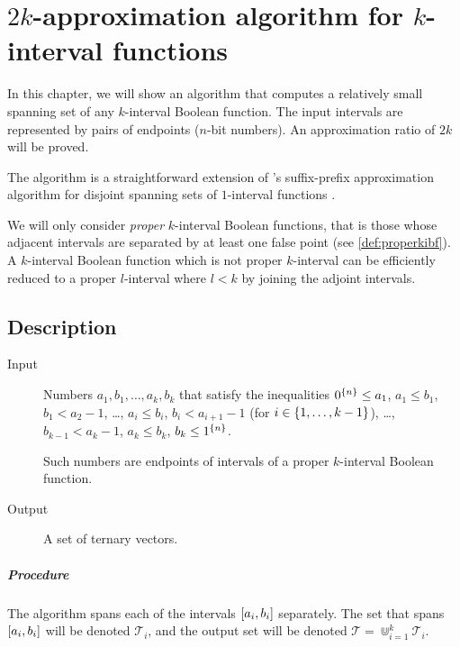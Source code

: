 \chapter{\texorpdfstring{$2k$}{2k}-approximation algorithm
for \texorpdfstring{$k$}{k}-interval functions}
\label{chap:2kapprox}

In this chapter,
we will show an algorithm that computes
a relatively
small spanning set
of any $k$-interval Boolean function.
The input intervals are represented by pairs of endpoints
($n$-bit numbers).
An approximation ratio of $2k$ will be proved.

The algorithm is a straightforward
extension of
\citeauthor{Schieber2005154}'s suffix-prefix
approximation algorithm
for disjoint spanning sets of $1$-interval functions
\citep[section 6]{Schieber2005154}.

We will only consider
\emph{proper} $k$-interval Boolean functions,
that is those whose adjacent intervals are separated by
at least one false point
(see \cref{def:properkibf}).
A $k$-interval Boolean function
which is not proper $k$-interval
can be efficiently reduced to a proper $l$-interval
where $l < k$
by joining the adjoint
intervals.

\section{Description}

\begin{description}
\item[Input] Numbers $a_1, b_1, \ldots, a_k, b_k$
that satisfy the inequalities
$0^{\{n\}} \leq a_1$,
$a_1 \leq b_1$,
$b_1 < a_2 - 1$,
\ldots,
$a_i \leq b_i$,
$b_i < a_{i+1} - 1$
(for $i \in \{1, \ldots, k-1\}$),
\ldots,
$b_{k-1} < a_k - 1$,
$a_k \leq b_k$,
$b_k \leq 1^{\{n\}}$.

Such numbers are endpoints of intervals
of a proper $k$-interval Boolean function.

\item[Output] A set of ternary vectors.
\end{description}

\paragraph{Procedure}
The algorithm spans each of
the intervals $[a_i, b_i]$ separately.
The set that spans $[a_i, b_i]$ will be denoted
$\mathcal{T}_i$,
and the output set will be denoted
$\mathcal{T} = \Cup_{i=1}^k{\mathcal{T}_i}$.

